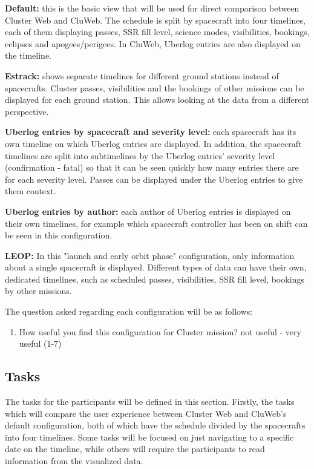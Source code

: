 \textbf{Default:} this is the basic view that will be used for direct comparison between Cluster Web and CluWeb. The schedule is split by spacecraft into four timelines, each of them displaying passes, SSR fill level, science modes, visibilities, bookings, eclipses and apogees/perigees. In CluWeb, Uberlog entries are also displayed on the timeline.

\textbf{Estrack:} shows separate timelines for different ground stations instead of spacecrafts. Cluster passes, visibilities and the bookings of other missions can be displayed for each ground station. This allows looking at the data from a different perspective.

\textbf{Uberlog entries by spacecraft and severity level:} each spacecraft has its own timeline on which Uberlog entries are displayed. In addition, the spacecraft timelines are split into subtimelines by the Uberlog entries' severity level (confirmation - fatal) so that it can be seen quickly how many entries there are for each severity level. Passes can be displayed under the Uberlog entries to give them context.

\textbf{Uberlog entries by author:} each author of Uberlog entries is displayed on their own timelines, for example which spacecraft controller has been on shift can be seen in this configuration.

\textbf{LEOP:} In this "launch and early orbit phase" configuration, only information about a single spacecraft is displayed. Different types of data can have their own, dedicated timelines, such as scheduled passes, visibilities, SSR fill level, bookings by other missions.

The question asked regarding each configuration will be as follows:
\begin{enumerate}
\item How useful you find this configuration for Cluster mission? not useful - very useful (1-7)
\end{enumerate}

\subsection{Tasks} \label{tasks_section}
The tasks for the participants will be defined in this section. Firstly, the tasks which will compare the user experience between Cluster Web and CluWeb's default configuration, both of which have the schedule divided by the spacecrafts into four timelines. Some tasks will be focused on just navigating to a specific date on the timeline, while others will require the participants to read information from the visualized data.

